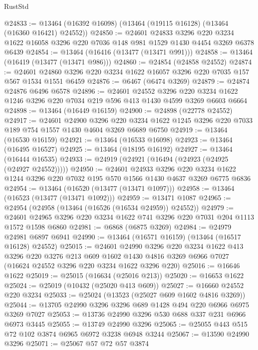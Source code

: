 \begin{lexlean}{RustStd}
\begin{coremodule}
@24833 := @13464 (@16392 @16098) (@13464 (@19115 @16128) (@13464 (@16360 @16421) @24552))
@24850 := @24601
    @24833
    @3296
    @220
    @3234
    @1622
    @16058
    @3296
    @220
    @7036
    @148
    @981
    @1529
    @1430
    @4454
    @3269
    @6378
    @6439
@24854 := @13464 (@16416 (@13477 (@13471 @991)))
@24858 := @13464 (@16419 (@13477 (@13471 @986)))
@24860 := @24854 (@24858 @24552)
@24874 := @24601 @24860 @3296 @220 @3234 @1622 @16057 @3296 @220 @7035 @157 @567 @1534 @1551 @6459
@24876 := @6467 (@6474 @3269)
@24879 := @24874 @24876 @6496 @6578
@24896 := @24601
    @24552
    @3296
    @220
    @3234
    @1622
    @1246
    @3296
    @220
    @7034
    @219
    @596
    @413
    @1430
    @4599
    @3269
    @6603
    @6664
@24898 := @13464 (@16449 @16159)
@24900 := @24898 (@22778 @24552)
@24917 := @24601
    @24900
    @3296
    @220
    @3234
    @1622
    @1245
    @3296
    @220
    @7033
    @189
    @754
    @1557
    @1430
    @4604
    @3269
    @6689
    @6750
@24919 := @13464 (@16530 @16159)
@24921 := @13464 (@16533 @16098)
@24923 := @13464 (@16495 @16527)
@24925 := @13464 (@18195 @16192)
@24927 := @13464 (@16444 @16535)
@24933 := @24919 (@24921 (@16494 (@24923 (@24925 (@24927 @24552)))))
@24950 := @24601
    @24933
    @3296
    @220
    @3234
    @1622
    @1244
    @3296
    @220
    @7032
    @195
    @570
    @1566
    @1430
    @4637
    @3269
    @6775
    @6836
@24954 := @13464 (@16520 (@13477 (@13471 @1097)))
@24958 := @13464 (@16523 (@13477 (@13471 @1092)))
@24959 := @13471 @1087
@24965 := @24954 (@24958 (@13464 (@16526 (@16534 @24959)) @24552))
@24979 := @24601 @24965 @3296 @220 @3234 @1622 @741 @3296 @220 @7031 @204 @1113 @1572 @1598 @6860
@24981 := @6868 (@6875 @3269)
@24984 := @24979 @24981 @6897 @6941
@24990 := @13464 (@16571 @16159) (@13464 (@16517 @16128) @24552)
@25015 := @24601
    @24990
    @3296
    @220
    @3234
    @1622
    @413
    @3296
    @220
    @3276
    @213
    @609
    @1602
    @1430
    @4816
    @3269
    @6966
    @7027
    (@16624 @24552 @3296 @220 @3234 @1622 @3296 @220)
@25016 := @16646 @1622
@25019 := @25015 (@16634 (@25016 @213))
@25020 := @16653 @1622
@25024 := @25019 (@10432 (@25020 @413 @609))
@25027 := @16660 @24552 @220 @3234
@25033 := @25024 (@13523 (@25027 @609 @1602 @4816 @3269))
@25044 := @13705 @24990 @3296 @3296 @689 @1428 @494 @220 @6966 @6975 @3269 @7027
@25053 := @13736 @24990 @3296 @530 @688 @337 @231 @6966 @6973 @3445
@25055 := @13749 @24990 @3296
@25065 := @25055 @443 @515 @72 @102 @3874 @6965 @6972 @3238 @6948 @3244
@25067 := @13590 @24990 @3296
@25071 := @25067 @57 @72 @57 @3874

\end{coremodule}
\end{lexlean}
